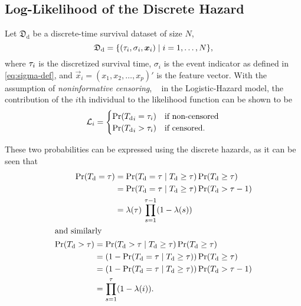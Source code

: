 \subsection{Log-Likelihood of the Discrete Hazard}

Let \(\mathfrak{D}_{\mathrm{d}}\) 
be a discrete-time survival dataset of size \(N\),
\begin{equation}
    \mathfrak{D}_{\mathrm{d}} = 
    \{(\tau_i, \sigma_i, \bm{x}_i) \mid i = 1, \ldots, N\},
\end{equation}
where \(\tau_i\) is the discretized survival time, 
\(\sigma_i\) is the event indicator as defined in \cref{eq:sigma-def},
and \(\vec{x}_i = (x_1, x_2, \dots, x_p)'\) is the feature vector.
With the assumption of \emph{noninformative censoring},
~\autocite{kalbfleischStatistical2002}
in the Logistic-Hazard model, 
the contribution of the \(i\)th individual to the likelihood function
can be shown to be  
~\autocite{tutzModeling2016}
\begin{equation}
    \Lik_i = %
    \begin{cases}
        \PR (\Tid_i = \tid_i) & \text{if non-censored} \\
        \PR (\Tid_i > \tid_i) & \text{if censored}.
    \end{cases}
\end{equation}

These two probabilities can be expressed using the discrete hazards,
as it can be seen that
\begin{align}
    \begin{split}
    \operatorname{\Pr} ({T_{\mathrm{d}}} = \tau) 
    &= \operatorname{\Pr} ({T_{\mathrm{d}}} = \tau \mid {T_{\mathrm{d}}} \geq \tau) \operatorname{\Pr} ({T_{\mathrm{d}}}  \geq \tau) \\
    &= \operatorname{\Pr} ({T_{\mathrm{d}}} = \tau \mid {T_{\mathrm{d}}} \geq \tau) \operatorname{\Pr} ({T_{\mathrm{d}}}  > \tau - 1) \\
    &= \lambda (\tau) \, \prod_{s=1}^{\tau - 1} (1 - \lambda(s))
    \end{split} \\
    \intertext{and similarly}
    \begin{split}
    \operatorname{\Pr} ({T_{\mathrm{d}}} > \tau) 
        &= \operatorname{\Pr} ({T_{\mathrm{d}}} > \tau \mid {T_{\mathrm{d}}} \geq \tau) \operatorname{\Pr} ({T_{\mathrm{d}}}  \geq \tau) \\
        &= (1 - \operatorname{\Pr} ({T_{\mathrm{d}}} = \tau \mid {T_{\mathrm{d}}} \geq \tau)) \operatorname{\Pr} ({T_{\mathrm{d}}}  \geq \tau) \\
        &= (1 - \operatorname{\Pr} ({T_{\mathrm{d}}} = \tau \mid {T_{\mathrm{d}}} \geq \tau)) \operatorname{\Pr} ({T_{\mathrm{d}}}  > \tau - 1) \\
        &= \prod_{s=1}^{\tau} (1 - \lambda(i)).
    \end{split}
\end{align}

